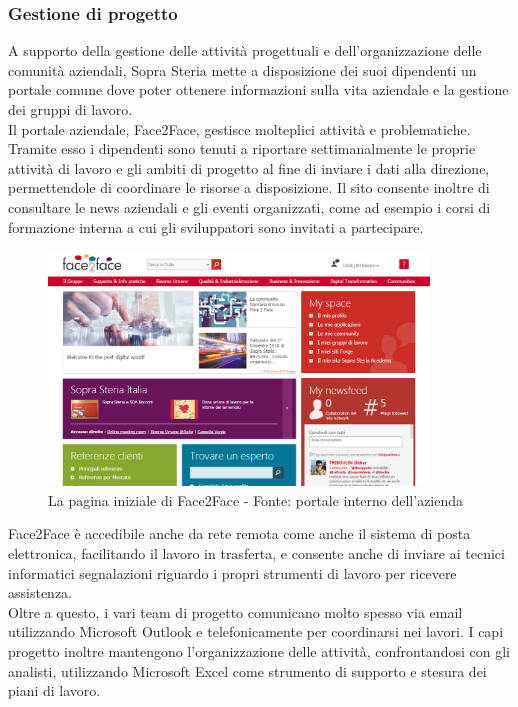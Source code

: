 	\subsubsection{Gestione di progetto}
	A supporto della gestione delle attività progettuali e dell'organizzazione delle comunità aziendali, Sopra Steria mette a disposizione dei suoi dipendenti un portale comune dove poter ottenere informazioni sulla vita aziendale e la gestione dei gruppi di lavoro. \\
	
	Il portale aziendale, Face2Face, gestisce molteplici attività e problematiche. Tramite esso i dipendenti sono tenuti a riportare settimanalmente le proprie attività di lavoro e gli ambiti di progetto al fine di inviare i dati alla direzione, permettendole di coordinare le risorse a disposizione. Il sito consente inoltre di consultare le news aziendali e gli eventi organizzati, come ad esempio i corsi di formazione interna a cui gli sviluppatori sono invitati a partecipare.

	\begin{figure}[H]
		\centering
	   	\includegraphics[width=0.9\textwidth]{immagini/face2face}
	   	\caption{La pagina iniziale di Face2Face - Fonte: portale interno dell'azienda}
	\end{figure}
		
	Face2Face è accedibile anche da rete remota come anche il sistema di posta elettronica, facilitando il lavoro in trasferta, e consente anche di inviare ai tecnici informatici segnalazioni riguardo i propri strumenti di lavoro per ricevere assistenza.\\
	
	Oltre a questo, i vari team di progetto comunicano molto spesso via email utilizzando Microsoft Outlook e telefonicamente per coordinarsi nei lavori. I capi progetto inoltre mantengono l'organizzazione delle attività, confrontandosi con gli analisti, utilizzando Microsoft Excel come strumento di supporto e stesura dei piani di lavoro.
	
